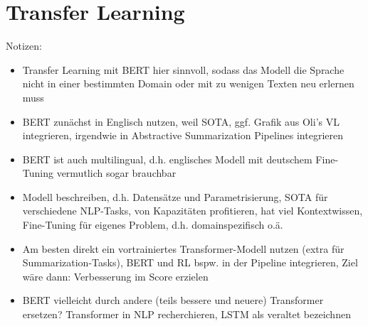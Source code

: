 \section{Transfer Learning}
Notizen:
\begin{itemize}
	\item Transfer Learning mit BERT hier sinnvoll, sodass das Modell die Sprache nicht in einer bestimmten Domain oder mit zu wenigen Texten neu erlernen muss
	\item BERT zunächst in Englisch nutzen, weil SOTA, ggf. Grafik aus Oli's VL integrieren, irgendwie in Abstractive Summarization Pipelines integrieren
	\item BERT ist auch multilingual, d.h. englisches Modell mit deutschem Fine-Tuning vermutlich sogar brauchbar
	\item Modell beschreiben, d.h. Datensätze und Parametrisierung, SOTA für verschiedene NLP-Tasks, von Kapazitäten profitieren, hat viel Kontextwissen, Fine-Tuning für eigenes Problem, d.h. domainspezifisch o.ä.
	\item Am besten direkt ein vortrainiertes Transformer-Modell nutzen (extra für Summarization-Tasks), BERT und RL bspw. in der Pipeline integrieren, Ziel wäre dann: Verbesserung im Score erzielen
	\item BERT vielleicht durch andere (teils bessere und neuere) Transformer ersetzen? Transformer in NLP recherchieren, LSTM als veraltet bezeichnen
\end{itemize}


